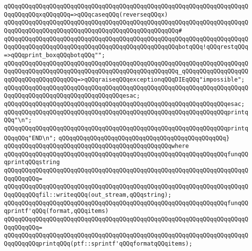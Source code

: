 \verb|qQQqqQQqqQQqqQQqqQQqqQQqqQQqqQQqqQQqqQQqqQQqqQQqqQQqqQQqqQQqqQQqqQQqqQQqqQQqqQQqxqQQqqQQq=>qQQqcaseqQQq(reverseqQQqx)|\newline
\verb|qQQqqQQqqQQqqQQqqQQqqQQqqQQqqQQqqQQqqQQqqQQqqQQqqQQqqQQqqQQqqQQqqQQqqQQqqQQqqQQqqQQqqQQqqQQqqQQqqQQqqQQqqQQqqQQqqQQqqQQq#|\newline
\verb|qQQqqQQqqQQqqQQqqQQqqQQqqQQqqQQqqQQqqQQqqQQqqQQqqQQqqQQqqQQqqQQqqQQqqQQqqQQqqQQqqQQqqQQqqQQqqQQqqQQqqQQqqQQqqQQqqQQqqQQqbotqQQq!qQQqrestqQQq=>qQQqprint_boxqQQqbotqQQq"";|\newline
\verb|qQQqqQQqqQQqqQQqqQQqqQQqqQQqqQQqqQQqqQQqqQQqqQQqqQQqqQQqqQQqqQQqqQQqqQQqqQQqqQQqqQQqqQQqqQQqqQQqqQQqqQQqqQQqqQQqqQQqqQQq_qQQqqQQqqQQqqQQqqQQqqQQqqQQqqQQqqQQqqQQq=>qQQqraiseqQQqexceptionqQQqDIEqQQq"impossible";|\newline
\verb|qQQqqQQqqQQqqQQqqQQqqQQqqQQqqQQqqQQqqQQqqQQqqQQqqQQqqQQqqQQqqQQqqQQqqQQqqQQqqQQqqQQqqQQqqQQqqQQqqQQqqQQqesac;|\newline
\verb|qQQqqQQqqQQqqQQqqQQqqQQqqQQqqQQqqQQqqQQqqQQqqQQqqQQqqQQqqQQqqQQqesac;|\newline
\newline
\verb|qQQqqQQqqQQqqQQqqQQqqQQqqQQqqQQqqQQqqQQqqQQqqQQqqQQqqQQqqQQqqQQqprintqQQq"\n";|\newline
\newline
\verb|qQQqqQQqqQQqqQQqqQQqqQQqqQQqqQQqqQQqqQQqqQQqqQQqqQQqqQQqqQQqqQQqprintqQQqqQQq"END\n";|\newline
\verb|qQQqqQQqqQQqqQQqqQQqqQQqqQQqqQQqqQQqqQQqqQQqqQQq}|\newline
\verb|qQQqqQQqqQQqqQQqqQQqqQQqqQQqqQQqqQQqqQQqqQQqqQQqwhere|\newline
\verb|qQQqqQQqqQQqqQQqqQQqqQQqqQQqqQQqqQQqqQQqqQQqqQQqqQQqqQQqqQQqqQQqfunqQQqprintqQQqstring|\newline
\verb|qQQqqQQqqQQqqQQqqQQqqQQqqQQqqQQqqQQqqQQqqQQqqQQqqQQqqQQqqQQqqQQqqQQqqQQqqQQqqQQq=|\newline
\verb|qQQqqQQqqQQqqQQqqQQqqQQqqQQqqQQqqQQqqQQqqQQqqQQqqQQqqQQqqQQqqQQqqQQqqQQqqQQqqQQqfil::writeqQQq(out_stream,qQQqstring);|\newline
\newline
\newline
\verb|qQQqqQQqqQQqqQQqqQQqqQQqqQQqqQQqqQQqqQQqqQQqqQQqqQQqqQQqqQQqqQQqfunqQQqprintf'qQQq(format,qQQqitems)|\newline
\verb|qQQqqQQqqQQqqQQqqQQqqQQqqQQqqQQqqQQqqQQqqQQqqQQqqQQqqQQqqQQqqQQqqQQqqQQqqQQqqQQq=|\newline
\verb|qQQqqQQqqQQqqQQqqQQqqQQqqQQqqQQqqQQqqQQqqQQqqQQqqQQqqQQqqQQqqQQqqQQqqQQqqQQqqQQqprintqQQq(ptf::sprintf'qQQqformatqQQqitems);|\newline
